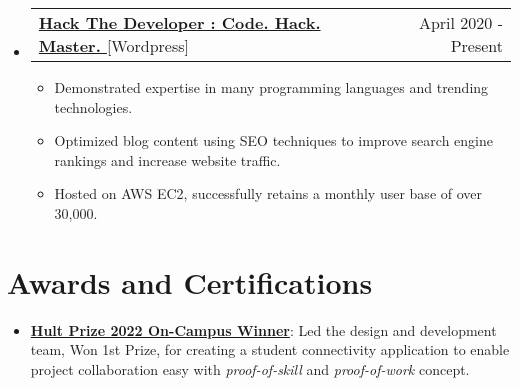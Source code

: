 \documentclass[letterpaper,11pt]{article}
\makeatletter
\newcommand{\resumeItem}[1]{
  \item\small{
    {#1 \vspace{-2pt}}
  }
}
\newcommand{\resumeProjectHeading}[2]{
    \item
    \begin{tabular*}{0.97\textwidth}{l@{\extracolsep{\fill}}r}
      \small#1 & #2 \\
    \end{tabular*}\vspace{-7pt}
}
\newcommand{\resumeSubHeadingListStart}{\begin{itemize}[leftmargin=0.15in, label={}]}
\newcommand{\resumeSubHeadingListEnd}{\end{itemize}}
\newcommand{\resumeItemListStart}{\begin{itemize}}
\newcommand{\resumeItemListEnd}{\end{itemize}\vspace{-5pt}}
\makeatother
\begin{document}
\resumeSubHeadingListStart
      \resumeProjectHeading
          {\textbf{\href{https://hackthedeveloper.com} {Hack The Developer : Code. Hack. Master. }}{[Wordpress]}}{ April 2020 - Present}
          \resumeItemListStart
           \resumeItem{Demonstrated expertise in many programming languages and trending technologies.}
           \resumeItem{Optimized blog content using SEO techniques to improve search engine rankings and increase website traffic.}
           \resumeItem{Hosted on AWS EC2, successfully retains a monthly user base of over 30,000.}
          \resumeItemListEnd
    \resumeSubHeadingListEnd

\section{Awards and Certifications}
 \begin{itemize}[leftmargin=0.15in, label={}]
    \small{\item{
        \resumeItemListStart
            \resumeItem{\textbf{\href{https://www.linkedin.com/posts/dshekhar17_hultprize2022-hultprizekiit-kiituniversity-activity-6899007358467743746-6hZ3}{Hult Prize 2022 On-Campus Winner}}: Led the design and development team, Won 1st Prize, for creating a student connectivity application to enable project collaboration easy with \textit{proof-of-skill} and \textit{proof-of-work} concept.}
            
      \resumeItemListEnd
    }}
 \end{itemize}

%
\end{document}
